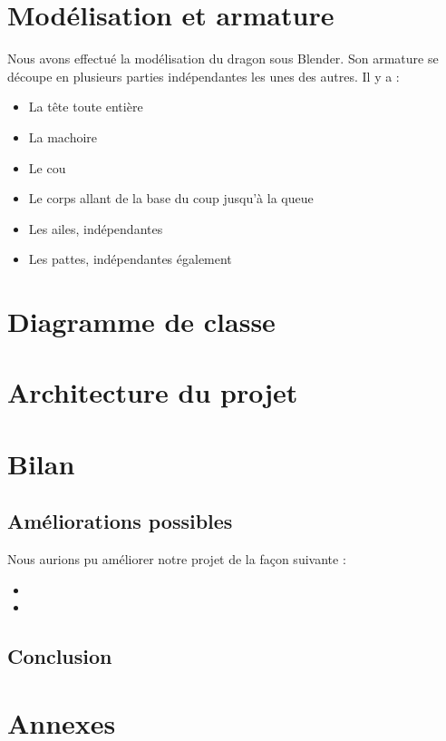 \documentclass[a4paper]{report}
\begin{document}
\newpage
\chapter{Modélisation et armature}
\par
Nous avons effectué la modélisation du dragon sous Blender. Son armature se découpe en plusieurs parties indépendantes les unes des autres. Il y a :
\begin{itemize}
\item La tête toute entière
\item La machoire
\item Le cou
\item Le corps allant de la base du coup jusqu'à la queue
\item Les ailes, indépendantes
\item Les pattes, indépendantes également
\end{itemize}
\newpage
\chapter{Diagramme de classe}


\newpage
\chapter{Architecture du projet}

\chapter{Bilan}

\section{Améliorations possibles}
\par
Nous aurions pu améliorer notre projet de la façon suivante :
\begin{itemize}
\item 
\item 
\end{itemize}

\section{Conclusion}
\par

\newpage
\chapter{Annexes}
\end{document}
